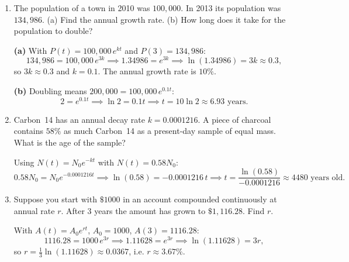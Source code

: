 \documentclass[10pt]{article}
\begin{document}
\begin{enumerate}[leftmargin=*, label=\numbox{\arabic*}, resume]

\item
    \begin{problem}[\vspace{5cm}]
        The population of a town in 2010 was \(100{,}000\). In 2013 its population was \(134{,}986\).
        (a) Find the annual growth rate. (b) How long does it take for the population to double?
    \end{problem}
    \begin{solution}
        \textbf{(a)} With \(P(t) = 100{,}000\, e^{kt}\) and \(P(3) = 134{,}986\):
        \[
            134{,}986 = 100{,}000\, e^{3k}
            \implies 1.34986 = e^{3k}
            \implies \ln(1.34986) = 3k \approx 0.3,
        \]
        so \(3k \approx 0.3\) and \(k = 0.1\). The annual growth rate is \(10\%\).

        \textbf{(b)} Doubling means \(200{,}000 = 100{,}000\, e^{0.1t}\):
        \[
            2 = e^{0.1t} \implies \ln 2 = 0.1t \implies t = 10\ln 2 \approx 6.93 \text{ years.}
        \]
    \end{solution}

\item
    \begin{problem}[\vspace{5cm}]
        Carbon~14 has an annual decay rate \(k = 0.0001216\). A piece of charcoal contains \(58\%\)
        as much Carbon~14 as a present-day sample of equal mass. What is the age of the sample?
    \end{problem}
    \begin{solution}
        Using \(N(t) = N_0 e^{-kt}\) with \(N(t) = 0.58 N_0\):
        \[
            0.58 N_0 = N_0 e^{-0.0001216 t}
            \implies \ln(0.58) = -0.0001216\, t
            \implies t = \frac{\ln(0.58)}{-0.0001216} \approx 4480 \text{ years old.}
        \]
    \end{solution}

\item
    \begin{problem}[\vspace{5cm}]
        Suppose you start with \(\$1000\) in an account compounded continuously at annual rate \(r\).
        After 3 years the amount has grown to \(\$1{,}116.28\). Find \(r\).
    \end{problem}
    \begin{solution}
        With \(A(t) = A_0 e^{rt}\), \(A_0 = 1000\), \(A(3) = 1116.28\):
        \[
            1116.28 = 1000\, e^{3r}
            \implies 1.11628 = e^{3r}
            \implies \ln(1.11628) = 3r,
        \]
        so \(r = \tfrac{1}{3}\ln(1.11628) \approx 0.0367\), i.e. \(r \approx 3.67\%\).
    \end{solution}


\end{enumerate}
\end{document}
